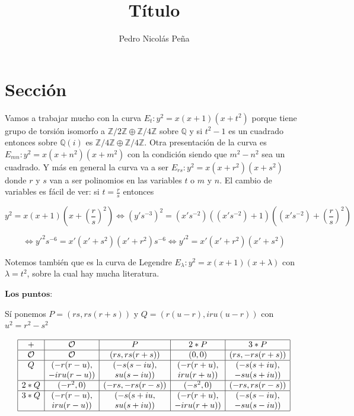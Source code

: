 \documentclass[12pt]{amsart}
\title{Título}
\author{Pedro Nicolás Peña}
\newcommand{\QQ}{\mathbb{Q}}
\newcommand{\ZZ}{\mathbb{Z}}
\newcommand{\OO}{\mathcal{O}}
\newcommand{\leg}[2]{\left( \frac{#1}{#2} \right)}
\newcommand{\lp}{\left(}
\newcommand{\rp}{\right)}
\theoremstyle{plain}
\begin{document}
\maketitle


\section*{Sección}

Vamos a trabajar mucho con la curva $E_t: y^2 = x(x+1)(x+t^2)$ porque tiene grupo de torsión isomorfo a $\ZZ/2\ZZ \oplus \ZZ/4\ZZ$ sobre $\QQ$ y si $t^2-1$ es un cuadrado entonces sobre $\QQ(i)$ es $\ZZ/4\ZZ \oplus \ZZ/4\ZZ$. Otra presentación de la curva es $E_{mn}: y^2 = x(x+n^2)(x+m^2)$ con la condición siendo que $m^2-n^2$ sea un cuadrado. Y más en general la curva va a ser $E_{rs}: y^2 = x(x+r^2)(x+s^2)$ donde $r$ y $s$ van a ser polinomios en las variables $t$ o $m$ y $n$. El cambio de variables es fácil de ver: si $t = \frac{r}{s}$ entonces

\[
y^2 = x(x+1)\lp x+\leg{r}{s}^2\rp \iff {(y's^{-3})}^2 = (x's^{-2})((x's^{-2})+1)\lp (x's^{-2})+\leg{r}{s}^2\rp 
\]

\[
\iff y'^2 s^{-6} = x'(x'+s^2)(x'+r^2) s^{-6} \iff y'^2 = x'(x'+r^2)(x'+s^2)
\]


Notemos también que es la curva de Legendre $E_\lambda : y^2 = x(x+1)(x+\lambda)$ con $\lambda = t^2$, sobre la cual hay mucha literatura.

$\textbf{Los puntos:}$

Sí ponemos $P = (rs,rs(r+s))$ y $Q = (r(u-r), iru(u-r))$ con $u^2=r^2-s^2$

\[
\begin{array}{|c|c|c|c|c|}
\hline
+   & \OO    & P      & 2*P    & 3*P \\ \hline

\OO & \OO     & (rs,rs(r+s)) & (0,0)     & (rs,-rs(r+s)) \\ \hline

Q& (-r(r-u),  & (-s(s-iu), & (-r(r+u), & (-s(s+iu), \\

&  -iru(r-u)) & su(s-iu))  & iru(r+u)) & -su(s+iu)) \\ \hline

2*Q& (-r^2,0) & (-rs,-rs(r-s))& (-s^2,0)& (-rs,rs(r-s)) \\ \hline

3*Q & (-r(r-u),& (-s(s+iu, & (-r(r+u), & (-s(s-iu), \\ 

&   iru(r-u)) & su(s+iu)) & -iru(r+u)) & -su(s-iu)) \\ \hline
\end{array}
\]
\end{document}
